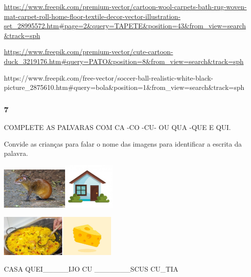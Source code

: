 \url{https://www.freepik.com/premium-vector/cartoon-wool-carpets-bath-rug-woven-mat-carpet-roll-home-floor-textile-decor-vector-illustration-set_28995572.htm\#page=2\&query=TAPETE\&position=43\&from_view=search\&track=sph}

\url{https://www.freepik.com/premium-vector/cute-cartoon-duck_3219176.htm\#query=PATO\&position=8\&from_view=search\&track=sph}

https://www.freepik.com/free-vector/soccer-ball-realistic-white-black-picture\_2875610.htm\#query=bola\&position=1\&from\_view=search\&track=sph

\subsubsection{7 }\label{section-6}

COMPLETE AS PALVARAS COM CA -CO -CU- OU QUA -QUE E QUI.

Convide as crianças para falar o nome das imagens para identificar a
escrita da palavra.

\includegraphics[width=1.30278in,height=0.81667in]{media/image26.jpeg}\includegraphics[width=1.00903in,height=0.90972in]{media/image27.jpeg}

\includegraphics[width=1.24028in,height=0.81042in]{media/image28.jpeg}\includegraphics[width=1.05556in,height=0.81667in]{media/image29.jpeg}

CASA QUEI\_\_\_\_\_IJO CU \_\_\_\_\_\_\_SCUS CU\_TIA

